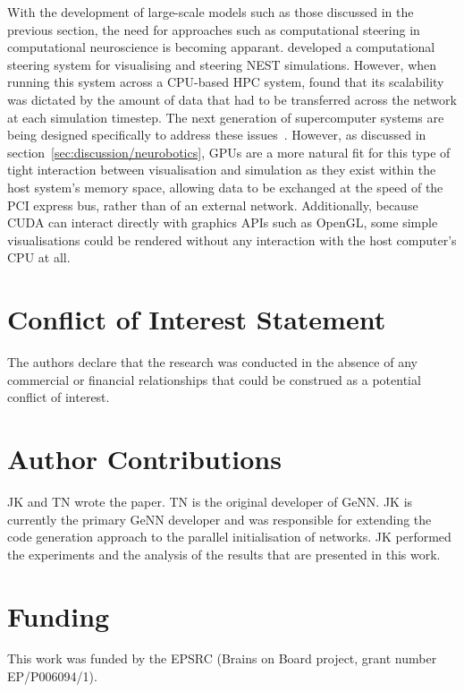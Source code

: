 \documentclass[utf8]{frontiersSCNS} %
\begin{document}
With the development of large-scale models such as those discussed in the previous section, the need for approaches such as computational steering in computational neuroscience is becoming apparant.
\citet{Nowke2018} developed a computational steering system for visualising and steering NEST simulations.
However, when running this system across a CPU-based HPC system, \citeauthor{Nowke2018} found that its scalability was dictated by the amount of data that had to be transferred across the network at each simulation timestep.
The next generation of supercomputer systems are being designed specifically to address these issues~\citep{Lippert2014}.
However, as discussed in section~\ref{sec:discussion/neurobotics}, GPUs are a more natural fit for this type of tight interaction between visualisation and simulation as they exist within the host system's memory space, allowing data to be exchanged at the speed of the PCI express bus, rather than of an external network.
Additionally, because CUDA can interact directly with graphics APIs such as OpenGL, some simple visualisations could be rendered without any interaction with the host computer's CPU at all.

\section*{Conflict of Interest Statement}
The authors declare that the research was conducted in the absence of any commercial or financial relationships that could be construed as a potential conflict of interest.

\section*{Author Contributions}
JK and TN wrote the paper.
TN is the original developer of GeNN.
JK is currently the primary GeNN developer and was responsible for extending the code generation approach to the parallel initialisation of networks.
JK performed the experiments and the analysis of the results that are presented in this work.

\section*{Funding}
This work was funded by the EPSRC (Brains on Board project, grant number EP/P006094/1).
\end{document}
